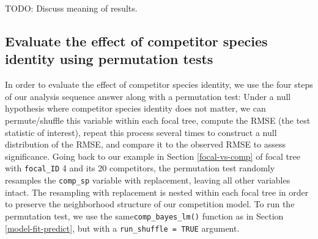 \documentclass[12pt]{article}
\newenvironment{Shaded}{\begin{snugshade}}{\end{snugshade}}
\newcommand{\CommentTok}[1]{\textcolor[rgb]{0.56,0.35,0.01}{\textit{#1}}}
\newcommand{\DataTypeTok}[1]{\textcolor[rgb]{0.13,0.29,0.53}{#1}}
\newcommand{\KeywordTok}[1]{\textcolor[rgb]{0.13,0.29,0.53}{\textbf{#1}}}
\newcommand{\NormalTok}[1]{#1}
\newcommand{\OperatorTok}[1]{\textcolor[rgb]{0.81,0.36,0.00}{\textbf{#1}}}
\newcommand{\OtherTok}[1]{\textcolor[rgb]{0.56,0.35,0.01}{#1}}
\newcommand{\StringTok}[1]{\textcolor[rgb]{0.31,0.60,0.02}{#1}}
\begin{document}
TODO: Discuss meaning of results.

\hypertarget{evaluate-the-effect-of-competitor-species-identity-using-permutation-tests}{%
\subsection{Evaluate the effect of competitor species identity using
permutation
tests}\label{evaluate-the-effect-of-competitor-species-identity-using-permutation-tests}}

In order to evaluate the effect of competitor species identity, we use
the four steps of our analysis sequence answer along with a permutation
test: Under a null hypothesis where competitor species identity does not
matter, we can permute/shuffle this variable within each focal tree,
compute the RMSE (the test statistic of interest), repeat this process
several times to construct a null distribution of the RMSE, and compare
it to the observed RMSE to assess significance. Going back to our
example in Section \ref{focal-vs-comp} of focal tree with
\texttt{focal\_ID} 4 and its 20 competitors, the permutation test
randomly resamples the \texttt{comp\_sp} variable with replacement,
leaving all other variables intact. The resampling with replacement is
nested within each focal tree in order to preserve the neighborhood
structure of our competition model. To run the permutation test, we use
the same\texttt{comp\_bayes\_lm()} function as in Section
\ref{model-fit-predict}, but with a \texttt{run\_shuffle\ =\ TRUE}
argument.

\begin{Shaded}
\end{Shaded}
\end{document}
